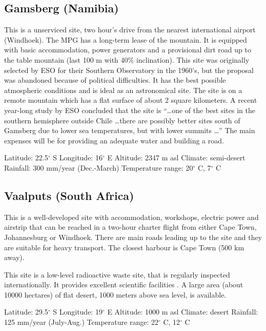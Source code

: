 \subsection{Gamsberg (Namibia)}

\medskip This is a unserviced site, two hour's drive from the nearest international
airport (Windhoek). The MPG has a long-term lease of the mountain. It is
equipped with basic accommodation, power generators and a provisional dirt
road up to the table mountain (last 100 m with 40\% inclination). This site
was originally selected by ESO for their Southern Observatory in the 1960's,
but the proposal was abandoned because of political difficulties. It has the
best possible atmospheric conditions and is ideal as an astronomical site.
The site is on a remote mountain which has a flat surface of about 2 square
kilometers. A recent year-long study by ESO concluded that
the site is ``\dots one of the best sites in the southern hemisphere outside
Chile \dots there are possibly better sites south of Gamsberg due to lower
sea temperatures, but with lower summits \dots'' The main expenses will be
for providing an adequate water and building a road.

\noindent
Latitude: 22.5$^\circ$ S \newline
Longitude: 16$^\circ$ E \newline
Altitude: 2347 m asl \newline
Climate: semi-desert \newline
Rainfall: 300 mm/year (Dec.-March)\newline
Temperature range: 20$^\circ$ C, 7$^\circ$ C

\subsection{Vaalputs (South Africa)}

\medskip This is a well-developed site with accommodation, workshops, electric power
and airstrip that can be reached in a two-hour charter flight from either
Cape Town, Johannesburg or Windhoek. There are main roads leading up to the
site and they are suitable for heavy transport. The closest harbour is Cape
Town (500 km away).

This site is a low-level radioactive waste site, that is regularly inspected
internationally. It provides excellent scientific facilities \cite{auger}.
A large area (about 10000 hectares) of flat desert, 1000
meters above sea level, is available.

\noindent
Latitude: 29.5$^\circ$ S \newline
Longitude: 19$^\circ$ E \newline
Altitude: 1000 m asl \newline
Climate: desert \newline
Rainfall: 125 mm/year (July-Aug.)\newline
Temperature range: 22$^\circ$ C, 12$^\circ$ C

